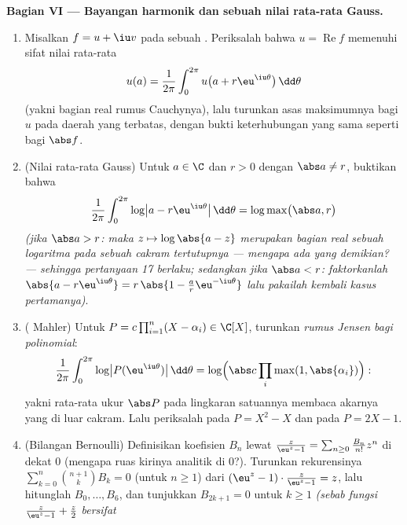\begin{problem}
\medskip
\noindent\textbf{Bagian VI --- Bayangan harmonik dan sebuah nilai
rata-rata Gauss.}
\begin{enumerate}[resume]
  \item Misalkan $f = u + \iu v$  pada sebuah .
        Periksalah bahwa $u = \operatorname{Re}f$ memenuhi
        sifat nilai rata-rata
        \[
        u(a) = \frac1{2\pi}\int_0^{2\pi}
        u\bigl(a + r\eu^{\iu\theta}\bigr)\,\dd\theta
        \]
        (yakni bagian real rumus Cauchynya), lalu turunkan
        asas maksimumnya bagi $u$ pada daerah yang terbatas, dengan
        bukti keterhubungan yang sama seperti bagi $\abs f$.
  \item (Nilai rata-rata Gauss) Untuk $a \in \C$ dan $r > 0$ dengan
        $\abs a \neq r$, buktikan bahwa
        \[
        \frac1{2\pi}\int_0^{2\pi}
        \log\bigl|a - r\eu^{\iu\theta}\bigr|\,\dd\theta
        = \log\max\bigl(\abs a, r\bigr)
        \]
        \emph{(jika $\abs a > r$: maka $z \mapsto \log\abs{a - z}$
        merupakan bagian real sebuah logaritma  pada sebuah
         cakram tertutupnya --- mengapa ada yang demikian? ---
        sehingga pertanyaan 17 berlaku; sedangkan jika $\abs a < r$:
        faktorkanlah $\abs{a - r\eu^{\iu\theta}} = r\,\abs{1 -
        \frac ar\eu^{-\iu\theta}}$ lalu pakailah kembali kasus
        pertamanya)}.
  \item ( Mahler) Untuk $P = c\prod_{i=1}^n(X -
        \alpha_i) \in \C[X]$, turunkan \emph{rumus Jensen
        bagi polinomial}:
        \[
        \frac1{2\pi}\int_0^{2\pi}\log\bigl|P(\eu^{\iu\theta})
        \bigr|\,\dd\theta
        = \log\Bigl(\abs c\prod_{i}\max(1,
        \abs{\alpha_i})\Bigr) :
        \]
        yakni rata-rata ukur $\abs P$ pada lingkaran satuannya
        membaca akarnya yang di luar cakram. Lalu periksalah pada $P =
        X^2 - X$ dan pada $P = 2X - 1$.
  \item (Bilangan Bernoulli) Definisikan koefisien $B_n$ lewat
        $\frac{z}{\eu^z - 1} = \sum_{n\geq0}\frac{B_n}{n!}
        z^n$ di dekat $0$ (mengapa ruas kirinya analitik di
        $0$?). Turunkan rekurensinya
        $\sum_{k=0}^{n}\binom{n+1}kB_k = 0$ (untuk $n \geq 1$) dari
        $(\eu^z - 1)\cdot\frac z{\eu^z-1} = z$, lalu hitunglah $B_0,
        \dots, B_6$, dan tunjukkan $B_{2k+1} = 0$ untuk $k \geq 1$
        \emph{(sebab fungsi $\frac z{\eu^z-1} + \frac z2$ bersifat
}
\end{enumerate}
\end{problem}
